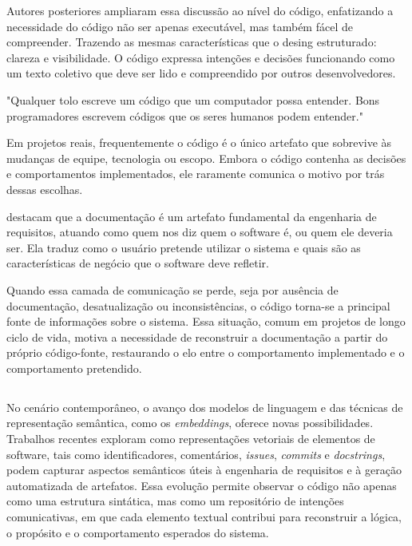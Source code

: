 \documentclass[12pt,a4paper]{article}
\begin{document}
Autores posteriores ampliaram essa discussão ao nível do código, enfatizando a necessidade do código não ser apenas executável, mas também fácel de compreender. Trazendo as mesmas características que o desing estruturado: clareza e visibilidade. O código expressa intenções e decisões funcionando como um texto coletivo que deve ser lido e compreendido por outros desenvolvedores.

"Qualquer tolo escreve um código que um computador possa entender. Bons programadores escrevem códigos que os seres humanos podem entender." \textcite{fowler2018refactoring}

Em projetos reais, frequentemente o código é o único artefato que sobrevive às mudanças de equipe, tecnologia ou escopo. Embora o código contenha as decisões e comportamentos implementados, ele raramente comunica o motivo por trás dessas escolhas. 

\textcite{wiegers2013software} destacam que a documentação é um artefato fundamental da engenharia de requisitos, atuando como quem nos diz quem o software é, ou quem ele deveria ser. Ela traduz como o usuário pretende utilizar o sistema e quais são as características de negócio que o software deve refletir.

Quando essa camada de comunicação se perde, seja por ausência de documentação, desatualização ou inconsistências, o código torna-se a principal fonte de informações sobre o sistema. Essa situação, comum em projetos de longo ciclo de vida, motiva a necessidade de reconstruir a documentação a partir do próprio código-fonte, restaurando o elo entre o comportamento implementado e o comportamento pretendido.


\subsection{}

No cenário contemporâneo, o avanço dos modelos de linguagem e das técnicas de representação semântica, como os \textit{embeddings}, oferece novas possibilidades. Trabalhos recentes exploram como representações vetoriais de elementos de software, tais como identificadores, comentários, \textit{issues}, \textit{commits} e \textit{docstrings}, podem capturar aspectos semânticos úteis à engenharia de requisitos e à geração automatizada de artefatos. Essa evolução permite observar o código não apenas como uma estrutura sintática, mas como um repositório de intenções comunicativas, em que cada elemento textual contribui para reconstruir a lógica, o propósito e o comportamento esperados do sistema.
\end{document}
